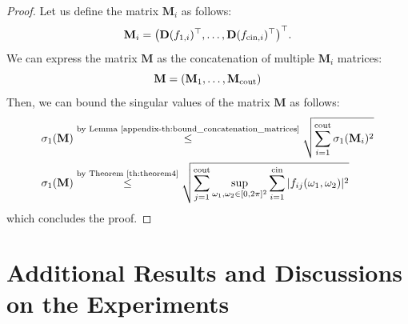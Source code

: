 \begin{proof}

Let us define the matrix $\mathbf{M}_i$ as follows:
\begin{equation}
    \mathbf{M}_i = \leftmat \mathbf{D}(f_{1, i})^\top, \dots, \mathbf{D}(f_{\cin, i})^\top \rightmat^\top .
\end{equation}
We can express the matrix $\mathbf{M}$ as the concatenation of multiple $\mathbf{M}_i$ matrices:
\begin{equation}
    \mathbf{M} = \leftmat \mathbf{M}_1, \dots, \mathbf{M}_{\cout} \rightmat
\end{equation}
Then, we can bound the singular values of the matrix $\mathbf{M}$ as follows:
\begin{align}
    \sigma_1\left(\mathbf{M}\right) &\stackrel{\text{by Lemma~\ref{appendix-th:bound_concatenation_matrices}}}{\leq} \sqrt{\sum_{i=1}^{\cout} \sigma_1(\mathbf{M}_i)^2} \\
    \sigma_1\left(\mathbf{M}\right) &\stackrel{\text{by Theorem~\ref{th:theorem4}}}{\leq} \sqrt{\sum_{j=1}^{\cout} \sup_{\omega_1, \omega_2 \in [0, 2\pi]^2} \sum_{i=1}^{\cin} |f_{ij}(\omega_1, \omega_2)|^2 }
\end{align}
which concludes the proof. 
\end{proof}




\section{Additional Results and Discussions on the Experiments}

